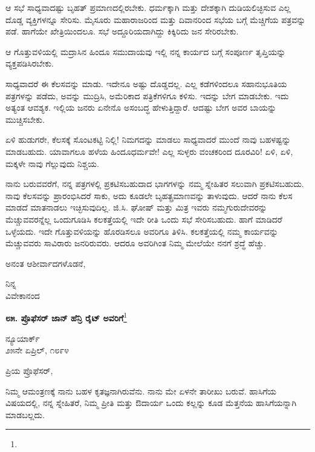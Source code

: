 ಆ ಸಭೆ ಸಾಧ್ಯವಾದಷ್ಟು ಬೃಹತ್ ಪ್ರಮಾಣದಲ್ಲಿರಬೇಕು. ಧರ್ಮಕ್ಕಾಗಿ ಮತ್ತು ದೇಶಕ್ಕಾಗಿ ದುಡಿಯಲಿಚ್ಛಿಸುವ ಎಲ್ಲ ದೊಡ್ಡ ವ್ಯಕ್ತಿಗಳನ್ನೂ ಸೇರಿಸು. ಮೈಸೂರು ಮಹಾರಾಜರಿಂದ ಮತ್ತು ದಿವಾನರಿಂದ ಸಭೆಯ ಬಗ್ಗೆ ಮೆಚ್ಚಿಗೆಯ ಪತ್ರವನ್ನು ಪಡೆ. ಹಾಗೆಯೇ ಖೇತ್ರಿಯಿಂದಲೂ. ಸಭೆ ಅದ್ದೂರಿಯದಾಗಿದ್ದು ಕಿಕ್ಕಿರಿದು ಜನ ಸೇರಿರಬೇಕು.

ಆ ಗೊತ್ತುವಳಿಯಲ್ಲಿ ಮದ್ರಾಸಿನ ಹಿಂದೂ ಸಮುದಾಯವು ಇಲ್ಲಿ ನನ್ನ ಕಾರ್ಯದ ಬಗ್ಗೆ ಸಂಪೂರ್ಣ ತೃಪ್ತಿಯನ್ನು ವ್ಯಕ್ತಪಡಿಸಿರಬೇಕು.

ಸಾಧ್ಯವಾದರೆ ಈ ಕೆಲಸವನ್ನು ಮಾಡು. ಇದೇನೂ ಅಷ್ಟು ದೊಡ್ಡದಲ್ಲ. ಎಲ್ಲ ಕಡೆಗಳಿಂದಲೂ ಸಹಾನುಭೂತಿಯ ಪತ್ರಗಳನ್ನು ಪಡೆದು, ಅವನ್ನು ಮುದ್ರಿಸಿ, ಅಮೆರಿಕಾದ ಪತ್ರಿಕೆಗಳಿಗೂ ಕಳಿಸು. ಇದನ್ನು ಬೇಗ ಮಾಡಬೇಕು. ಇದು ಅತ್ಯಂತ ಆವಶ್ಯಕ. ಇಲ್ಲಿಯ ಜನರು ಏನೇನೊ ಅಸಂಬದ್ಧ ಹೇಳುತ್ತಿದ್ದಾರೆ. ಆದಷ್ಟು ಬೇಗ ಅವರ ಬಾಯನ್ನು ಮುಚ್ಚಿಸಬೇಕು.

ಏಳಿ ಹುಡುಗರೇ, ಕೆಲಸಕ್ಕೆ ಸೊಂಟಕಟ್ಟಿ ನಿಲ್ಲಿ! ನಿಮಗದನ್ನು ಮಾಡಲು ಸಾಧ್ಯವಾದರೆ ಮುಂದೆ ನಾವು ಬಹಳಷ್ಟನ್ನು ಮಾಡಬಹುದು. ಯಾವಾಗಲೂ ಹಳೆಯ ಹಿಂದೂಧರ್ಮವೇ! ಎಲ್ಲ ಸುಳ್ಳರು ವಂಚಕರಿಂದ ದೂರವಿರಿ! ಏಳಿ, ಏಳಿ, ಮಕ್ಕಳೇ ನಾವು ಗೆಲ್ಲುವುದು ನಿಶ್ಚಯ.

ನಾನು ಬರುವವರೆಗೆ, ನನ್ನ ಪತ್ರಗಳಲ್ಲಿ ಪ್ರಕಟಿಸಬಹುದಾದ ಭಾಗಗಳನ್ನು ನಮ್ಮ ಸ್ನೇಹಿತರ ಸಲುವಾಗಿ ಪ್ರಕಟಿಸಬಹುದು. ನಾವು ಕೆಲಸವನ್ನು ಪ್ರಾರಂಭಿಸಿದರೆ ಸಾಕು, ಅದು ಕೂಡಲೇ ಬೃಹತ್ಪ್ರಮಾಣವನ್ನು ತಾಳುವುದು. ಆದರೆ ನಾನು ಕೆಲಸ ಮಾಡದೆ ಮಾತನಾಡಲು ಇಚ್ಛಿಸುವುದಿಲ್ಲ. ಜಿ.ಸಿ. ಘೋಷ್ ಮತ್ತು ಮಿತ್ರ ಇವರು ನಮ್ಮಗುರುದೇವರನ್ನು ಮೆಚ್ಚುವವರನ್ನೆಲ್ಲ ಒಂದುಗೂಡಿಸಿ ಕಲಕತ್ತೆಯಲ್ಲಿ ಇದೇ ರೀತಿ ಒಂದು ಸಭೆ ಸೇರಿಸಬಹುದು. ಹಾಗೆ ಮಾಡಿದರೆ ಒಳ್ಳೆಯದು. ಇದೇ ಗೊತ್ತುವಳಿಯನ್ನು ಹೊರಡಿಸಲೂ ಅವರಿಗೂ ತಿಳಿಸಿ. ಕಲಕತ್ತೆಯಲ್ಲಿ ನಮ್ಮ ಕಾರ್ಯವನ್ನು ಮೆಚ್ಚುವವರು ಸಾವಿರಾರು ಜನರಿರುವರು. ಆದರೂ ಅವರಿಗಿಂತ ನಿಮ್ಮ ಮೇಲೆಯೇ ನನಗೆ ಶ್ರದ್ಧೆ ಹೆಚ್ಚು.

ಅನಂತ ಆಶೀರ್ವಾದಗಳೊಡನೆ,

{\flushright
ನಿನ್ನ\\ವಿವೇಕಾನಂದ\par}

\begin{center}
\textbf{೮೫. ಪ್ರೊಫೆಸರ್ ಜಾನ್ ಹೆನ್ರಿ ರೈಟ್ ಅವರಿಗೆ}\footnote{}
\end{center}

\vspace{-0.5cm}

\begin{flushright}
ನ್ಯೂಯಾರ್ಕ್\\೨೫ನೇ ಏಪ್ರಿಲ್, ೧೮೯೪
\end{flushright}

\vspace{-0.5cm}

\noindent
ಪ್ರಿಯ ಪ್ರೊಫೆಸರ್,

ನಿಮ್ಮ ಆಮಂತ್ರಣಕ್ಕೆ ನಾನು ಬಹಳ ಕೃತಜ್ಞನಾಗಿರುವೆನು. ನಾನು ಮೇ ಏಳನೇ ತಾರೀಖು ಬರುವೆ. ಹಾಸಿಗೆಯ ವಿಷಯದಲ್ಲಿ, ನನ್ನ ಸ್ನೇಹಿತರೆ, ನಿಮ್ಮ ಪ್ರೀತಿ ಮತ್ತು ಔದಾರ್ಯ ಒಂದು ಕಲ್ಲನ್ನು ಕೂಡ ಮೆತ್ತನೆಯ ಹಾಸಿಗೆಯನ್ನಾಗಿ ಮಾಡಬಲ್ಲದು.

